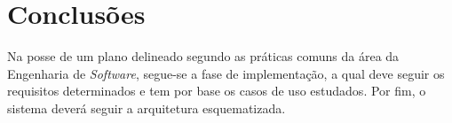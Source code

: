 



\section{Conclusões}
\label{sec::engsoft:conclusao}

Na posse de um plano delineado segundo as práticas comuns da área da Engenharia de \textit{Software}, segue-se a fase de implementação, a qual deve seguir os requisitos determinados e tem por base os casos de uso estudados. Por fim, o sistema deverá seguir a arquitetura esquematizada.
